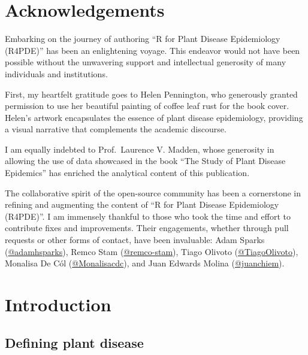 \documentclass[
  letterpaper,
]{book}
\begin{document}

\hypertarget{acknowledgements}{%
\chapter*{Acknowledgements}\label{acknowledgements}}


Embarking on the journey of authoring ``R for Plant Disease Epidemiology
(R4PDE)'' has been an enlightening voyage. This endeavor would not have
been possible without the unwavering support and intellectual generosity
of many individuals and institutions.

First, my heartfelt gratitude goes to Helen Pennington, who generously
granted permission to use her beautiful painting of coffee leaf rust for
the book cover. Helen's artwork encapsulates the essence of plant
disease epidemiology, providing a visual narrative that complements the
academic discourse.

I am equally indebted to Prof.~Laurence V. Madden, whose generosity in
allowing the use of data showcased in the book ``The Study of Plant
Disease Epidemics'' has enriched the analytical content of this
publication.

The collaborative spirit of the open-source community has been a
cornerstone in refining and augmenting the content of ``R for Plant
Disease Epidemiology (R4PDE)''. I am immensely thankful to those who
took the time and effort to contribute fixes and improvements. Their
engagements, whether through pull requests or other forms of contact,
have been invaluable: Adam Sparks
(\href{https://github.com/adamhsparks}{@adamhsparks}), Remco Stam
(\href{https://github.com/remco-stam}{@remco-stam}), Tiago Olivoto
(\href{https://github.com/TiagoOlivoto}{@TiagoOlivoto}), Monalisa De Cól
(\href{https://github.com/Monalisacdc}{@Monalisacdc}), and Juan Edwards
Molina (\href{https://github.com/juanchiem}{@juanchiem}).


\hypertarget{introduction}{%
\chapter{Introduction}\label{introduction}}

\hypertarget{defining-plant-disease}{%
\section{Defining plant disease}\label{defining-plant-disease}}
\end{document}
